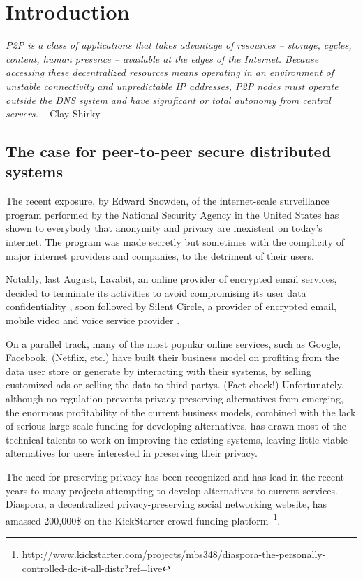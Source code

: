 \chapter{Introduction}

\textit{P2P is a class of applications that takes advantage of resources -- storage, cycles, content, human presence -- available at the edges of the Internet. Because accessing these decentralized resources means operating in an environment of unstable connectivity and unpredictable IP addresses, P2P nodes must operate outside the DNS system and have significant or total autonomy from central servers.} -- Clay Shirky~\cite{Shirky:2000}


\section{The case for peer-to-peer secure distributed systems}

The recent exposure, by Edward Snowden, of the internet-scale surveillance program performed by the National Security Agency in the United States \cite{} has shown to everybody that anonymity and privacy are inexistent on today's internet. The program was made secretly but sometimes with the complicity of major internet providers and companies, to the detriment of their users.

Notably, last August, Lavabit, an online provider of encrypted email services, decided to terminate its activities to avoid compromising its user data confidentiality \cite{}, soon followed by Silent Circle, a provider of encrypted email, mobile video and voice service provider \cite{}.

On a parallel track, many of the most popular online services, such as Google, Facebook, (Netflix, etc.) have built their business model on profiting from the data user store or generate by interacting with their systems, by selling customized ads or selling the data to third-partys. (Fact-check!) Unfortunately, although no regulation prevents privacy-preserving alternatives from emerging, the enormous profitability of the current business models, combined with the lack of serious large scale funding for developing alternatives, has drawn most of the technical talents to work on improving the existing systems, leaving little viable alternatives for users interested in preserving their privacy.

The need for preserving privacy has been recognized and has lead in the recent years to many projects attempting to develop alternatives to current services. Diaspora, a decentralized privacy-preserving social networking website, has amassed 200,000\$ on the KickStarter crowd funding platform~\footnote{\url{http://www.kickstarter.com/projects/mbs348/diaspora-the-personally-controlled-do-it-all-distr?ref=live}}.


